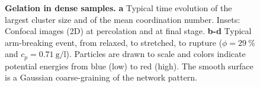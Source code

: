 \begin{figure}
	\centering
	\caption{\textbf{Gelation in dense samples.} \textbf{a} Typical time evolution of the largest cluster size and of the mean coordination number. Insets: Confocal images (2D) at percolation and at final stage. \textbf{b-d} Typical arm-breaking event, from relaxed, to stretched, to rupture ($\phi=29~\%$ and $c_p=\SI{0.71}{\gram\per\litre}$). Particles are drawn to scale and colors indicate potential energies from blue (low) to red (high). The smooth surface is a Gaussian coarse-graining of the network pattern. %
	}
	\label{fig:dense}
\end{figure}

